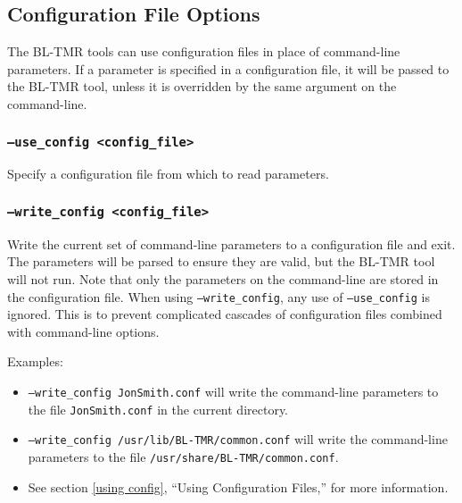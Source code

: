\subsection{Configuration File Options}
\label{config options}
The BL-TMR tools can use configuration files in place of command-line parameters. 
If a parameter is specified in a configuration file, it will be passed to the 
BL-TMR tool, unless it is overridden by the same argument on the command-line. 

\subsubsection{\texttt{--use\_config <config\_file>}}
\label{useConfig}
Specify a configuration file from which to read parameters.

\subsubsection{\texttt{--write\_config <config\_file>}}
Write the current set of command-line parameters to a configuration file and 
exit. The parameters will be parsed to ensure they are valid, but the BL-TMR
tool will not run. Note that only the parameters on the command-line are stored
in the configuration file. When using \texttt{--write\_config}, any use of
\texttt{--use\_config} is ignored. This is to prevent complicated cascades
of configuration files combined with command-line options.

Examples:
\begin{itemize}
  \item \texttt{--write\_config JonSmith.conf} will write the command-line 
  parameters to the file \texttt{JonSmith.conf} in the current directory.
  \item \texttt{--write\_config /usr/lib/BL-TMR/common.conf} will write the
  command-line parameters to the file \texttt{/usr/share/BL-TMR/common.conf}. 
  \item See section \ref{using config}, ``Using Configuration Files,'' for
  more information.
\end{itemize}
